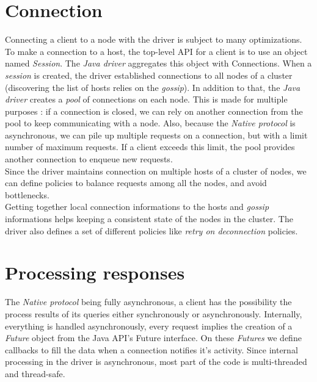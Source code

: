 \documentclass[a4paper]{report}
\newcommand{\jd}{\emph{Java driver }}
\begin{document}
\section{Connection}
Connecting a client to a node with the driver is subject to many optimizations. To make a connection to a host, the top-level API for a client is to use an object named \emph{Session}. The \jd aggregates this object with Connections. When a \emph{session} is created, the driver established connections to all nodes of a cluster (discovering the list of hosts relies on the \emph{gossip}). In addition to that, the \jd creates a \emph{pool} of connections on each node. This is made for multiple purposes : if a connection is closed, we can rely on another connection from the pool to keep communicating with a node. Also, because the \emph{Native protocol} is asynchronous, we can pile up multiple requests on a connection, but with a limit number of maximum requests. If a client exceeds this limit, the pool provides another connection to enqueue new requests.\\
Since the driver maintains connection on multiple hosts of a cluster of nodes, we can define policies to balance requests among all the nodes, and avoid bottlenecks.\\
Getting together local connection informations to the hosts and \emph{gossip} informations helps keeping a consistent state of the nodes in the cluster. The driver also defines a set of different policies like \emph{retry on deconnection } policies.
\section{Processing responses}
The \emph{Native protocol} being fully asynchronous, a client has the possibility the process results of its queries either synchronously or asynchronously. Internally, everything is handled asynchronously, every request implies the creation of a \emph{Future} object from the Java API's Future interface. On these \emph{Futures} we define callbacks to fill the data when a connection notifies it's activity. Since internal processing in the driver is asynchronous, most part of the code is multi-threaded and thread-safe.
\end{document}
